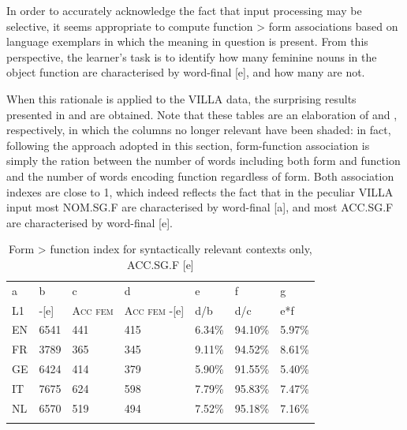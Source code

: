 In order to accurately acknowledge the fact that input processing may be selective, it seems appropriate to compute function > form associations based on language exemplars in which the meaning in question is present. From this perspective, the learner’s task is to identify how many feminine nouns in the object function  are characterised by word-final [e], and how many are not. 

When this rationale is applied to the VILLA data, the surprising results presented in  and  are obtained. Note that these tables are an elaboration of  and , respectively, in which the columns no longer relevant have been shaded: in fact, following the approach adopted in this section, form-function association is simply the ration between the number of words including both form and function and the number of words encoding function regardless of form. Both association indexes are close to 1, which indeed reflects the fact that in the peculiar VILLA input most NOM.SG.F are characterised by word-final [a], and most ACC.SG.F are characterised by word-final [e].

\begin{table}
    \begin{tabularx}{\textwidth}{XXXXXXX}
        \lsptoprule
        a & b & c & d & e & f & g\\
        L1 & {}-[e] & \textsc{Acc} \textsc{fem} & \textsc{Acc} \textsc{fem} -[e] & d/b & d/c & e*f\\
        EN & 6541 & 441 & 415 & 6.34\% & 94.10\% & 5.97\%\\
        FR & 3789 & 365 & 345 & 9.11\% & 94.52\% & 8.61\%\\
        GE & 6424 & 414 & 379 & 5.90\% & 91.55\% & 5.40\%\\
        IT & 7675 & 624 & 598 & 7.79\% & 95.83\% & 7.47\%\\
        NL & 6570 & 519 & 494 & 7.52\% & 95.18\% & 7.16\%\\
        \lspbottomrule
    \end{tabularx}
    \caption{Form > function index for syntactically relevant contexts only, ACC.SG.F [e]}
    \label{tab:08:1}
\end{table}

